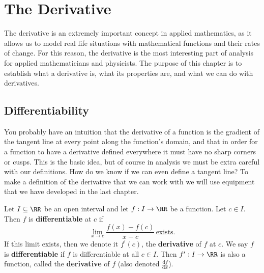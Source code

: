 \documentclass[../real_analysis.tex]{subfiles}
\begin{document}
    \section{The Derivative}\label{sec:the-derivative}
        The derivative is an extremely important concept in applied mathematics, as it allows us to model real life situations with mathematical functions and their rates of change.
        For this reason, the derivative is the most interesting part of analysis for applied mathematicians and physicists.
        The purpose of this chapter is to establish what a derivative is, what its properties are, and what we can do with derivatives.

        \subsection{Differentiability}\label{subsec:differentiability}
            You probably have an intuition that the derivative of a function is the gradient of the tangent line at every point along the function's domain, and that in order for a function to have a derivative defined everywhere it must have no sharp corners or cusps. This is the basic idea, but of course in analysis we must be extra careful with our definitions. How do we know if we can even define a tangent line? To make a definition of the derivative that we can work with we will use equipment that we have developed in the last chapter.
            \begin{definition}
                Let $I\subseteq\RR$ be an open interval and let $f: I\to\RR$ be a function. Let $c\in I$. Then $f$ is \textbf{differentiable} at $c$ if
                \begin{equation}
                    \lim_{x\to c}\frac{f(x)-f(c)}{x-c}\,\text{exists.}
                \end{equation}
                If this limit exists, then we denote it $f^\prime(c)$, the \textbf{derivative} of $f$ at $c$. We say $f$ is \textbf{differentiable} if $f$ is differentiable at all $c\in I$. Then $f^\prime:I\to\RR$ is also a function, called the \textbf{derivative} of $f$ (also denoted $\frac{\mathrm{d}f}{\mathrm{d}x}$).
            \end{definition}
\end{document}
